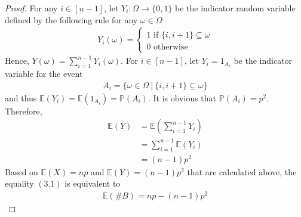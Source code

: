 \begin{proof}
  For any $i \in [n-1]$, let $Y_{i} : \Omega \to \{0,1\}$ be the indicator random variable defined by the following rule for any $\omega \in \Omega$
  \begin{align*}
    Y_{i}(\omega) = 
    \begin{cases}
      1 \text{ if $\{i,i+1\} \subseteq \omega$} \\
      0 \text{ otherwise }
    \end{cases}
  \end{align*}
  Hence, $Y(\omega) = \sum\limits_{i=1}^{n-1} Y_{i}(\omega)$. For $i \in [n-1]$, let $Y_{i} = 1_{A_{i}}$ be the indicator variable for the event
  \begin{align*}
    A_{i} = \{\omega \in \Omega \ | \ \{i,i+1\} \subseteq \omega\} 
  \end{align*}
  and thus $\mathbb{E}(Y_{i}) = \mathbb{E}(1_{A_{i}}) = \mathbb{P}(A_{i})$. It is obvious that $\mathbb{P}(A_{i})=p^{2}$. Therefore,
  \begin{align*}
    \mathbb{E}(Y) &= \mathbb{E}(\sum\limits_{i=1}^{n-1} Y_{i}) \\
                  &= \sum\limits_{i=1}^{n-1} \mathbb{E}(Y_{i}) \\
                  &= (n-1)p^{2}
  \end{align*}
  Based on $\mathbb{E}(X)=np$ and $\mathbb{E}(Y) = (n-1)p^{2}$ that are calculated above, the equality $(3.1)$ is equivalent to
  \begin{align*}
    \mathbb{E}(\# B) = np - (n-1)p^{2}
  \end{align*}
\end{proof}
